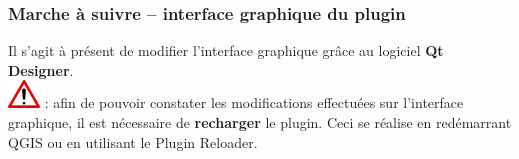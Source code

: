 \documentclass[11pt]{article}
\begin{document}
\hrulefill
\vspace*{1.6em}

\hrulefill
\vspace*{1.6em}















\newpage{}
\vspace*{-3.2em}
\subsubsection{Marche à suivre \--- interface graphique du plugin}
Il s'agit à présent de modifier l'interface graphique grâce au logiciel \og{}\textbf{Qt Designer}\fg{}. \\

\vspace*{-0.4em}
\includegraphics[scale=1]{warningt.png} \underline{}: afin de pouvoir constater les modifications effectuées sur l'interface graphique, il est nécessaire de \textbf{recharger} le plugin. Ceci se réalise en redémarrant QGIS ou en utilisant le \og{}Plugin Reloader\fg{}. 
\end{document}
